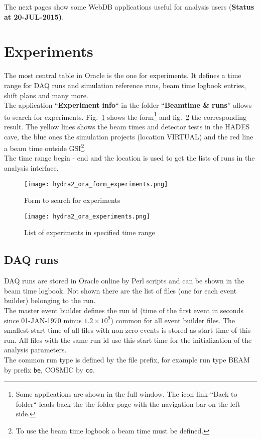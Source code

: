 The next pages show some WebDB applications useful for analysis users (\textbf{\color{red}Status at 20-JUL-2015)}.


\section[Experiments]{Experiments} \label{sec:oraExperiments}

The most central table in Oracle is the one for experiments. It defines a time range for DAQ runs and simulation reference
runs, beam time logbook entries, shift plans and many more.\\

The application ``\textbf{Experiment info}`` in the folder ``\textbf{Beamtime \& runs}'' allows to search for experiments. 
Fig.~\ref{fig:oraFormExperiments} shows the form\footnote{Some applications are shown in the full window. The icon link 
``Back to folder`` leads back the the folder page with the navigation bar on the left side.} and 
fig.~\ref{fig:oraExperiments} the corresponding result. The yellow lines shows the beam times and detector tests in the 
HADES cave, the blue ones the simulation projects (location VIRTUAL) and the red line a beam time outside 
GSI\footnote{To use the beam time logbook a beam time must be defined.}.\\
The time range begin - end and the location is used to get the lists of runs in the analysis interface.

\begin{figure}[\htb]
  \centering
  \texttt{[image: hydra2\_ora\_form\_experiments.png]}
  \caption[Form to search for experiments]{Form to search for experiments}
  \label{fig:oraFormExperiments}
\end{figure}

\begin{figure}[\htb]
  \centering
  \texttt{[image: hydra2\_ora\_experiments.png]}
  \caption[Experiments]{List of experiments in specified time range}
  \label{fig:oraExperiments}
\end{figure}


\subsection[DAQ runs]{DAQ runs} \label{sec:oraDaqRuns}
DAQ runs are stored in Oracle online by Perl scripts and can be shown in the beam time logbook. Not shown there are the list 
of files (one for each event builder) belonging to the run.\\
The master event builder defines the run id (time of the first event in seconds since 01-JAN-1970 minus $1.2\times10^9$) common 
for all event builder files. The smallest start time of all files with non-zero events is stored as start time of this run. 
All files with the same run id use this start time for the initialization of the analysis parameters.\\ 
The common run type is defined by the file prefix, for example run type BEAM by prefix \verb+be+, COSMIC by \verb+co+.\\

